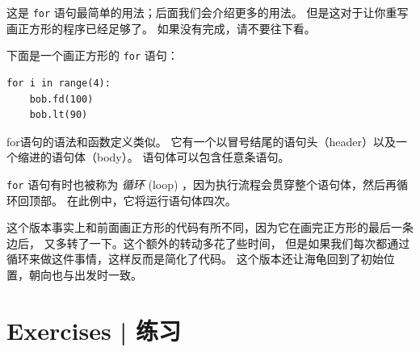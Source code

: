 这是 \lstinline{for} 语句最简单的用法；后面我们会介绍更多的用法。
但是这对于让你重写画正方形的程序已经足够了。 如果没有完成，请不要往下看。


下面是一个画正方形的 \lstinline{for} 语句：

\begin{lstlisting}
for i in range(4):
    bob.fd(100)
    bob.lt(90)
\end{lstlisting}


for语句的语法和函数定义类似。
它有一个以冒号结尾的语句头（header）以及一个缩进的语句体（body）。
语句体可以包含任意条语句。


\lstinline{for} 语句有时也被称为 \emph{循环} (loop) ，因为执行流程会贯穿整个语句体，然后再循环回顶部。
在此例中，它将运行语句体四次。



这个版本事实上和前面画正方形的代码有所不同，因为它在画完正方形的最后一条边后，
又多转了一下。这个额外的转动多花了些时间，
但是如果我们每次都通过循环来做这件事情，这样反而是简化了代码。
这个版本还让海龟回到了初始位置，朝向也与出发时一致。



\section{Exercises  |  练习}


